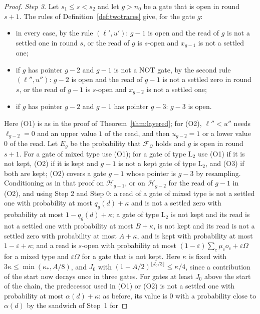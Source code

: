 \documentclass[11pt]{amsart}
\theoremstyle{definition}
\theoremstyle{remark}
\newcommand{\eps}{\varepsilon}
\begin{document}
\begin{proof}
\emph{Step 3.} Let $s_1\le s<s_2$ and let $g>n_0$ be a gate that is open in round $s+1$. The
rules of Definition~\ref{def:twotraces} give, for the gate $g$:
\begin{itemize}[leftmargin=3.2em]
\item[(O1)] in every case, by the rule $(\ell',u')$: $g-1$ is open and the read of $g$ is not a
settled one in round $s$, or the read of $g$ is $s$-open and $x_{g-1}$ is not a settled one;
\item[(O2)] if $g$ has pointer $g-2$ and $g-1$ is not a NOT gate, by the second rule
$(\ell'',u'')$: $g-2$ is open and the read of $g-1$ is not a settled zero in round $s$, or the
read of $g-1$ is $s$-open and $x_{g-2}$ is not a settled one;
\item[(O3)] if $g$ has pointer $g-2$ and $g-1$ has pointer $g-3$: $g-3$ is open.
\end{itemize}
Here (O1) is as in the proof of Theorem~\ref{thm:layered}; for (O2), $\ell''<u''$ needs
$\ell_{g-2}=0$ and an upper value $1$ of the read, and then $u_{g-2}=1$ or a lower value $0$ of
the read. Let $E_g$ be the probability that $\mathcal F_{\mathcal Q}$ holds and $g$ is open in
round $s+1$. For a gate of mixed type use (O1); for a gate of type $\mathrm L_2$ use (O1) if it
is not kept, (O2) if it is kept and $g-1$ is not a kept gate of type $\mathrm L_2$, and (O3) if
both are kept; (O2) covers a gate $g-1$ whose pointer is $g-3$ by resampling. Conditioning as
in that proof on $\mathcal H_{g-1}$, or on $\mathcal H_{g-2}$ for the read of $g-1$ in (O2), and
using Step 2 and Step 0: a read of a gate of mixed type is not a settled one with probability at
most $q_g(d)+\kappa$ and is not a settled zero with probability at most $1-q_g(d)+\kappa$; a
gate of type $\mathrm L_2$ is not kept and its read is not a settled one with probability at
most $B+\kappa$, is not kept and its read is not a settled zero with probability at most
$A+\kappa$, and is kept with probability at most $1-\eps+\kappa$; and a read is $s$-open with
probability at most $(1-\eps)\sum_c\mu_c o_c+\eps\Omega$ for a mixed type and $\eps\Omega$ for a
gate that is not kept. Here $\kappa$ is fixed with $3\kappa\le\min(\kappa_*,A/8)$, and $J_0$ with
$(1-A/2)^{\lfloor J_0/3\rfloor}\le\kappa/4$, since a contribution of the start now decays once
in three gates. For gates at least $J_0$ above the start of the chain, the predecessor
used in (O1) or (O2) is not a settled one with probability at most $\alpha(d)+\kappa$: as
before, its value is $0$ with a probability close to $\alpha(d)$ by the sandwich of Step~1 for

\end{proof}
\end{document}
